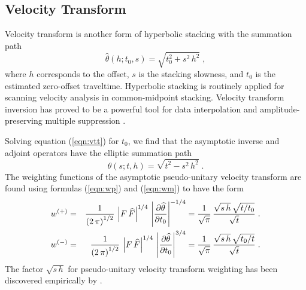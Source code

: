 \subsection{Velocity Transform}

Velocity transform is another form of hyperbolic stacking with the
summation path
\begin{equation}
\widehat{\theta}(h;t_0,s)  =  \sqrt{t_0^2 + s^2\,h^2}\;,
\label{eqn:vtt}
\end{equation}
where $h$ corresponds to the offset, $s$ is the stacking slowness, and
$t_0$ is the estimated zero-offset traveltime. Hyperbolic stacking is
routinely applied for scanning velocity analysis in common-midpoint
stacking. Velocity transform inversion has proved to be a powerful
tool for data interpolation and amplitude-preserving multiple
suppression \cite[]{Thorson.sepphd.39,Ji.sepphd.90,SEG-1995-1460}.
\par
Solving equation (\ref{eqn:vtt}) for $t_0$, we find that the asymptotic
inverse and adjoint operators have the elliptic summation path
\begin{equation}
\theta(s;t,h)  =  \sqrt{t^2 - s^2\,h^2}\;.
\end{equation}
The weighting functions of the asymptotic pseudo-unitary velocity
transform are found using formulas (\ref{eqn:wp}) and (\ref{eqn:wm})
to have the form
\begin{eqnarray}
  \label{eqn:vtpsun1}
w^{(+)} & = & {1\over{\left(2\,\pi\right)^{1/2}}} \, 
\left|F\,\widehat{F}\right|^{1/4}\,
\left|\partial \widehat{\theta} \over \partial t_0\right|^{- 1/4} =
{1\over{\sqrt{\pi}}}\, 
{{\sqrt{s\,h}\,\sqrt{t/t_0}} \over {\sqrt{t}}}\;.
 \\
 \label{eqn:vtpsun2}
w^{(-)} & = & {1\over{\left(2\,\pi\right)^{1/2}}} \, 
\left|F\,\widehat{F}\right|^{1/4}\,
\left|\partial \widehat{\theta} \over \partial t_0\right|^{3/4} =
{1\over{\sqrt{\pi}}} \, 
{{\sqrt{s\,h}\,\sqrt{t_0/t}} \over {\sqrt{t}}}\;.
\end{eqnarray}
The factor $\sqrt{s\,h}$ for pseudo-unitary velocity transform
weighting has been discovered empirically by \cite{Claerbout.bei.95}.

